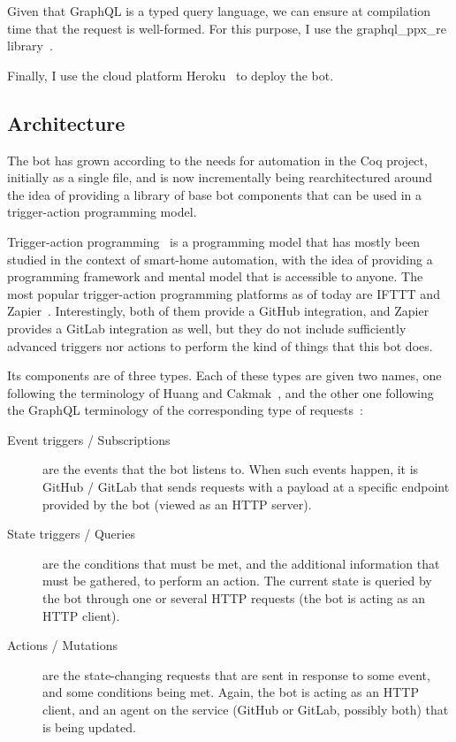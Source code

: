 Given that GraphQL is a typed query language, we can ensure at compilation time that the request is well-formed.
For this purpose, I use the graphql\_ppx\_re library~\cite{graphql_ppx_re}.

Finally, I use the cloud platform Heroku~\cite{heroku} to deploy the bot.

\subsection{Architecture}

The bot has grown according to the needs for automation in the Coq project, initially as a single file, and is now incrementally being rearchitectured around the idea of providing a library of base bot components that can be used in a trigger-action programming model.

Trigger-action programming~\cite{huang2015supporting} is a programming model that has mostly been studied in the context of smart-home automation, with the idea of providing a programming framework and mental model that is accessible to anyone.
The most popular trigger-action programming platforms as of today are IFTTT and Zapier~\cite{rahmati2017ifttt}.
Interestingly, both of them provide a GitHub integration, and Zapier provides a GitLab integration as well, but they do not include sufficiently advanced triggers nor actions to perform the kind of things that this bot does.

Its components are of three types.
Each of these types are given two names, one following the terminology of Huang and Cakmak~\cite{huang2015supporting}, and the other one following the GraphQL terminology of the corresponding type of requests~\cite[Section~3.2]{graphql_spec}:

\begin{description}
	\item[Event triggers / Subscriptions] are the events that the bot listens to. When such events happen, it is GitHub / GitLab that sends requests with a payload at a specific endpoint provided by the bot (viewed as an HTTP server).
	\item[State triggers / Queries] are the conditions that must be met, and the additional information that must be gathered, to perform an action. The current state is queried by the bot through one or several HTTP requests (the bot is acting as an HTTP client).
	\item[Actions / Mutations] are the state-changing requests that are sent in response to some event, and some conditions being met. Again, the bot is acting as an HTTP client, and an agent on the service (GitHub or GitLab, possibly both) that is being updated.
\end{description}


